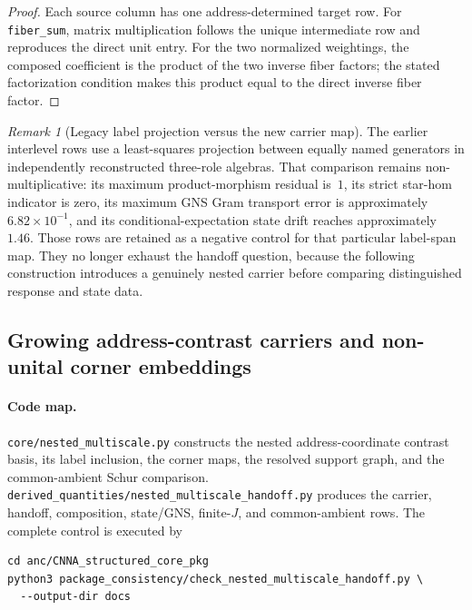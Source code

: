 \documentclass[11pt]{article}
\theoremstyle{remark}
\newtheorem{remark}[definition]{Remark}
\newcommand{\code}[1]{\texttt{#1}}
\numberwithin{equation}{section}
\begin{document}
\begin{proof}
Each source column has one address-determined target row. For \code{fiber\_sum}, matrix multiplication follows the unique intermediate row and reproduces the direct unit entry. For the two normalized weightings, the composed coefficient is the product of the two inverse fiber factors; the stated factorization condition makes this product equal to the direct inverse fiber factor.
\end{proof}

\begin{remark}[Legacy label projection versus the new carrier map]
The earlier interlevel rows use a least-squares projection between equally named generators in independently reconstructed three-role algebras.  That comparison remains non-multiplicative: its maximum product-morphism residual is~\(1\), its strict star-hom indicator is zero, its maximum GNS Gram transport error is approximately \(6.82\times10^{-1}\), and its conditional-expectation state drift reaches approximately~\(1.46\).  Those rows are retained as a negative control for that particular label-span map.  They no longer exhaust the handoff question, because the following construction introduces a genuinely nested carrier before comparing distinguished response and state data.
\end{remark}

\subsection{Growing address-contrast carriers and non-unital corner embeddings}\label{sec:nested-multiscale-handoff}
\paragraph{Code map.}
\code{core/nested\_multiscale.py} constructs the nested address-coordinate contrast basis, its label inclusion, the corner maps, the resolved support graph, and the common-ambient Schur comparison.  \code{derived\_quantities/nested\_multiscale\_handoff.py} produces the carrier, handoff, composition, state/GNS, finite-\(J\), and common-ambient rows.  The complete control is executed by
\begin{verbatim}
cd anc/CNNA_structured_core_pkg
python3 package_consistency/check_nested_multiscale_handoff.py \
  --output-dir docs
\end{verbatim}
\end{document}
